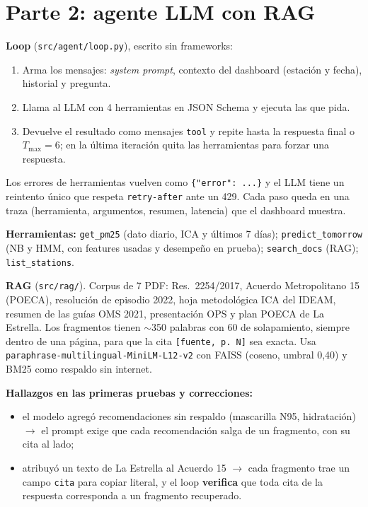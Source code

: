 \documentclass[10pt,a4paper]{article}
\newcommand{\code}[1]{\texttt{\small #1}}
\begin{document}
\section{Parte 2: agente LLM con RAG}
\textbf{Loop} (\code{src/agent/loop.py}), escrito sin frameworks:
\begin{enumerate}
  \item Arma los mensajes: \textit{system prompt}, contexto del dashboard (estación y fecha), historial y pregunta.
  \item Llama al LLM con 4 herramientas en JSON Schema y ejecuta las que pida.
  \item Devuelve el resultado como mensajes \code{tool} y repite hasta la respuesta final o
    $T_{\max} = 6$; en la última iteración quita las herramientas para forzar una respuesta.
\end{enumerate}
Los errores de herramientas vuelven como \code{\{"error": ...\}} y el LLM tiene un reintento único que
respeta \code{retry-after} ante un 429. Cada paso queda en una traza (herramienta, argumentos, resumen,
latencia) que el dashboard muestra.

\textbf{Herramientas:} \code{get\_pm25} (dato diario, ICA y últimos 7 días); \code{predict\_tomorrow}
(NB y HMM, con features usadas y desempeño en prueba); \code{search\_docs} (RAG); \code{list\_stations}.

\textbf{RAG} (\code{src/rag/}). Corpus de 7 PDF: Res.~2254/2017, Acuerdo Metropolitano 15 (POECA),
resolución de episodio 2022, hoja metodológica ICA del IDEAM, resumen de las guías OMS 2021,
presentación OPS y plan POECA de La Estrella. Los fragmentos tienen $\sim$350 palabras con 60 de
solapamiento, siempre dentro de una página, para que la cita \code{[fuente, p. N]} sea exacta. Usa
\code{paraphrase-multilingual-MiniLM-L12-v2} con FAISS (coseno, umbral 0,40) y BM25 como respaldo sin internet.

\textbf{Hallazgos en las primeras pruebas y correcciones:}
\begin{itemize}
  \item el modelo agregó recomendaciones sin respaldo (mascarilla N95, hidratación) $\rightarrow$ el
    prompt exige que cada recomendación salga de un fragmento, con su cita al lado;
  \item atribuyó un texto de La Estrella al Acuerdo 15 $\rightarrow$ cada fragmento trae un campo
    \code{cita} para copiar literal, y el loop \textbf{verifica} que toda cita de la respuesta corresponda
    a un fragmento recuperado.
\end{itemize}
\end{document}
